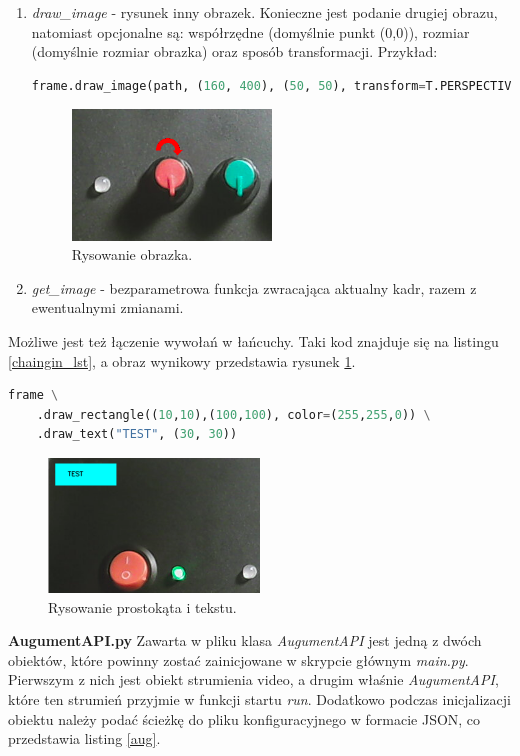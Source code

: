 \documentclass[12pt,twoside,polish]{article}
\begin{document}
\begin{enumerate}[label=\alph*), leftmargin=1.25cm]
\item \emph{draw\_image} - rysunek inny obrazek. Konieczne jest podanie drugiej obrazu, natomiast opcjonalne są: współrzędne (domyślnie punkt (0,0)), rozmiar (domyślnie rozmiar obrazka) oraz sposób transformacji. Przykład:
\begin{lstlisting}[language=Python]
frame.draw_image(path, (160, 400), (50, 50), transform=T.PERSPECTIVE)
\end{lstlisting}
\begin{figure}[h]
	\centering
	\includegraphics[width=0.5\textwidth]{draw_img}
	\caption {Rysowanie obrazka.}
\end{figure}

\item \emph{get\_image} - bezparametrowa funkcja zwracająca aktualny kadr, razem z ewentualnymi zmianami.
\end{enumerate}

Możliwe jest też łączenie wywołań w łańcuchy. Taki kod znajduje się na listingu \ref{chaingin_lst}, a obraz wynikowy przedstawia rysunek \ref{chaining}.
\begin{lstlisting}[language=Python, label=chaingin_lst]
frame \
	.draw_rectangle((10,10),(100,100), color=(255,255,0)) \
	.draw_text("TEST", (30, 30))
\end{lstlisting}
\begin{figure}[h]
	\centering
	\includegraphics[width=0.5\textwidth]{chaining}
	\caption{Rysowanie prostokąta i tekstu.}
	\label{chaining}
\end{figure}


\textbf{AugumentAPI.py}
Zawarta w pliku klasa \emph{AugumentAPI} jest jedną z dwóch obiektów, które powinny zostać zainicjowane w skrypcie głównym \emph{main.py}. Pierwszym z nich jest obiekt strumienia video, a drugim właśnie \emph{AugumentAPI}, które ten strumień przyjmie w funkcji startu \emph{run}. Dodatkowo podczas inicjalizacji obiektu należy podać ścieżkę do pliku konfiguracyjnego w formacie JSON, co przedstawia listing \ref{aug}.
\end{document}
